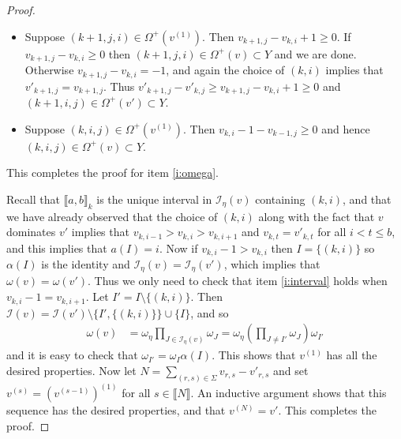 \documentclass[11pt,fleqn]{article}
\newcommand\I{\mathcal I}
\newcommand\interval[1]{\llbracket #1 \rrbracket}
\begin{document}
\begin{proof}
\begin{itemize}
\item Suppose $(k+1,j,i) \in \Omega^+(v^{(1)})$. Then $v_{k+1,j} - v_{k,i} + 1
\geq 0$. If $v_{k+1,j} - v_{k,i} \geq 0$ then $(k+1, j,i) \in \Omega^+(v) 
\subset Y$ and we are done. Otherwise $v_{k+1,j} - v_{k,i} = - 1$, and again
the choice of $(k,i)$ implies that $v'_{k+1,j} = v_{k+1,j}$. Thus $v'_{k+1,j}
- v'_{k,j} \geq v_{k+1,j} - v_{k,i} + 1 \geq 0$ and $(k+1,i,j) \in \Omega^+(v')
\subset Y$.

\item Suppose $(k,i,j) \in \Omega^+(v^{(1)})$. Then $v_{k,i} - 1 - v_{k-1,j}
\geq 0$ and hence $(k,i,j) \in \Omega^+(v) \subset Y$.
\end{itemize}
This completes the proof for item \ref{i:omega}.

Recall that $\interval{a,b}_k$ is the unique interval in $\I_\eta(v)$ 
containing $(k,i)$, and that we have already observed that the choice of 
$(k,i)$ along with the fact that $v$ dominates $v'$ implies that 
$v_{k,i-1} > v_{k,i} > v_{k,i+1}$ and $v_{k,t} = v'_{k,t}$ for all $i < t 
\leq b$, and this implies that $a(I) = i$. Now if $v_{k,i} - 1 > v_{k,i}$
then $I = \{(k,i)\}$ so $\alpha(I)$ is the identity and $\I_\eta(v) = 
\I_\eta(v')$, which implies that $\omega(v) = \omega(v')$. Thus we only
need to check that item \ref{i:interval} holds when $v_{k,i} - 1 = v_{k,i+1}$.
Let $I' = I \setminus \{(k,i)\}$. Then $\I(v) = \I(v') \setminus 
\{I', \{(k,i)\}\} \cup \{I\}$, and so
\begin{align*}
\omega(v) 
	&= \omega_\eta \prod_{J \in \I_\eta(v)} \omega_J 
	= \omega_\eta \left(\prod_{J \neq I'} \omega_J\right) \omega_{I'}
\end{align*} 
and it is easy to check that $\omega_{I'} = \omega_I \alpha(I)$. This shows 
that $v^{(1)}$ has all the desired properties. Now let $N = \sum_{(r,s) \in 
\Sigma} v_{r,s} - v'_{r,s}$ and set $v^{(s)} = (v^{(s-1)})^{(1)}$ for all $s 
\in \interval N$. An inductive argument shows that this sequence has the 
desired properties, and that $v^{(N)} = v'$. This completes the proof.
\end{proof}
\end{document}
